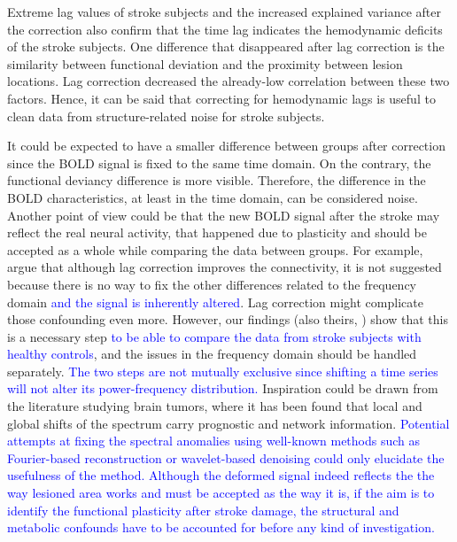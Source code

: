 \documentclass[fleqn,10pt]{wlscirep}
\begin{document}
Extreme lag values of stroke subjects and the increased explained variance after the correction also confirm that the time lag indicates the hemodynamic deficits of the stroke subjects. One difference that disappeared after lag correction is the similarity between functional deviation and the proximity between lesion locations. Lag correction decreased the already-low correlation between these two factors. Hence, it can be said that correcting for hemodynamic lags is useful to clean data from structure-related noise for stroke subjects.

It could be expected to have a smaller difference between groups after correction since the BOLD signal is fixed to the same time domain. On the contrary, the functional deviancy difference is more visible. Therefore, the difference in the BOLD characteristics, at least in the time domain, can be considered noise. Another point of view could be that the new BOLD signal after the stroke may reflect the real neural activity, that happened due to plasticity and should be accepted as a whole while comparing the data between groups. For example, \citet{siegel2016disruptions} argue that although lag correction improves the connectivity, it is not suggested because there is no way to fix the other differences related to the frequency domain \textcolor{blue}{and the signal is inherently altered}.  Lag correction might complicate those confounding even more. However, our findings (also theirs, \cite{siegel2016effects}) show that this is a necessary step \textcolor{blue}{to be able to compare the data from stroke subjects with healthy controls}, and the issues in the frequency domain should be handled separately. \textcolor{blue}{The two steps are not mutually exclusive since shifting a time series will not alter its power-frequency distribution.} Inspiration could be drawn from the literature studying brain tumors, where it has been found that local and global shifts of the spectrum carry prognostic \citep{park2023glioblastoma} and network \citep{falco2024functional} information. \textcolor{blue}{Potential attempts at fixing the spectral anomalies using well-known methods such as Fourier-based reconstruction or wavelet-based denoising could only elucidate the usefulness of the method. Although the deformed signal indeed reflects the the way lesioned area works and must be accepted as the way it is, if the aim is to identify the functional plasticity after stroke damage, the structural and metabolic confounds have to be accounted for before any kind of investigation. }
\end{document}
